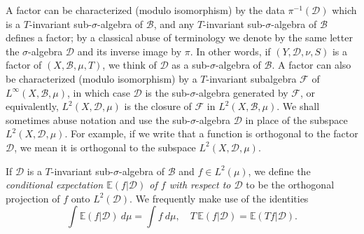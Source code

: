 \documentclass[11pt]{amsart}
\newcommand{\cB}{\mathcal{B}}
\newcommand{\cD}{\mathcal{D}}
\newcommand{\Q}{\mathbb{Q}}
\newcommand{\R}{\mathbb{R}}
\theoremstyle{plain}
\theoremstyle{definition}
\theoremstyle{remark}
\begin{document}

A factor can be characterized (modulo isomorphism) by the data
$\pi^{-1}(\mathcal{D})$ which is a $T$-invariant sub-$\sigma$-algebra
of $\mathcal B$, and any $T$-invariant sub-$\sigma$-algebra of
$\mathcal B$ defines a factor; by a classical abuse of terminology we
denote by the same letter the $\sigma$-algebra $\mathcal{D}$ and its
inverse image by $\pi$. In other words, if $(Y, \cD, \nu, S)$ is a
factor of $(X,\mathcal{B},\mu,T)$, we think of $\cD$ as a
sub-$\sigma$-algebra of $\mathcal{B}$. A factor can also be
characterized (modulo isomorphism) by a $T$-invariant subalgebra
$\mathcal{F}$ of $L^\infty(X,\mathcal{B},\mu)$, in which case $\cD$ is
the sub-$\sigma$-algebra generated by $\mathcal{F}$, or equivalently,
$L^2(X,\cD,\mu)$ is the closure of $\mathcal{F}$ in
$L^2(X,\mathcal{B},\mu)$. We shall sometimes abuse notation and use the sub-$\sigma$-algebra $\mathcal{D}$ in place of
 the subspace $L^2(X,\cD,\mu)$. For example, if we write that a function is orthogonal to the factor $\mathcal{D}$,
  we mean it  is orthogonal to the subspace $L^2(X,\cD,\mu)$.
%


If $\cD$ is a $T$-invariant sub-$\sigma$-algebra of $\cB$ and $f\in
L^2(\mu)$, we define the {\it conditional expectation
  $\mathbb{E}(f|\cD)$ of $f$ with respect to $\cD$} to be the
orthogonal projection of $f$ onto $L^2(\cD)$. We frequently make use
of the identities
$$
\int \mathbb{E}(f|\cD) \ d\mu= \int f\ d\mu, \quad
T\,\mathbb{E}(f|\cD)=\mathbb{E}(Tf|\cD).
$$


\end{document}
